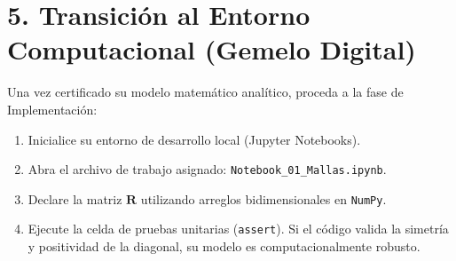 \documentclass[11pt,a4paper]{article}
\begin{document}
\section*{5. Transición al Entorno Computacional (Gemelo Digital)}
Una vez certificado su modelo matemático analítico, proceda a la fase de Implementación:
\begin{enumerate}[label=\textbf{\arabic*.}]
    \item Inicialice su entorno de desarrollo local (Jupyter Notebooks).
    \item Abra el archivo de trabajo asignado: \texttt{Notebook\_01\_Mallas.ipynb}.
    \item Declare la matriz $\mathbf{R}$ utilizando arreglos bidimensionales en \texttt{NumPy}.
    \item Ejecute la celda de pruebas unitarias (\texttt{assert}). Si el código valida la simetría y positividad de la diagonal, su modelo es computacionalmente robusto.
\end{enumerate}
\end{document}
